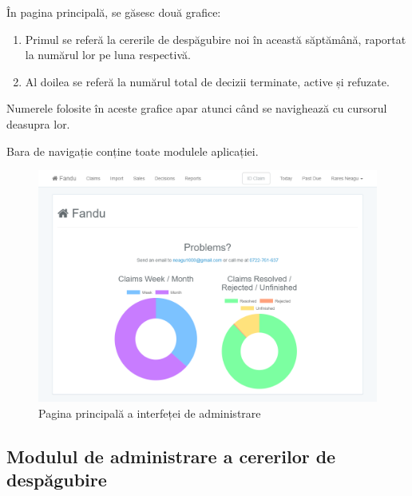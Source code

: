 	În pagina principală, se găsesc două grafice:
	\begin{enumerate}
		\item Primul se referă la cererile de despăgubire noi în această săptămână, raportat la numărul lor pe luna respectivă.
		\item Al doilea se referă la numărul total de decizii terminate, active și refuzate.
	\end{enumerate}

	Numerele folosite în aceste grafice apar atunci când se navighează cu cursorul deasupra lor.

	Bara de navigație conține toate modulele aplicației.

	\begin{figure}
		\includegraphics[width=\linewidth]{../imagini/home_page.png}
		\caption{Pagina principală a interfeței de administrare}
		\label{fig:home_page}
	\end{figure}

	\subsection{Modulul de administrare a cererilor de despăgubire}

